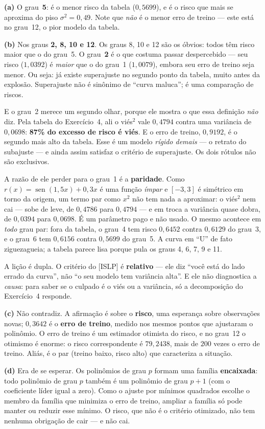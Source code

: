 \documentclass[11pt,a4paper]{article}
\begin{document}
\begin{solucao}
\textbf{(a)} O grau~\textbf{5}: é o menor risco da tabela ($0{,}5699$), e é o
risco que mais se aproxima do piso $\sigma^2=0{,}49$. Note que \emph{não} é o
menor erro de treino --- este está no grau~12, o pior modelo da tabela.

\smallskip
\textbf{(b)} Nos graus \textbf{2, 8, 10 e 12}. Os graus 8, 10 e 12 são os óbvios:
todos têm risco maior que o do grau~5. O grau~\textbf{2} é o que costuma passar
despercebido --- seu risco ($1{,}0392$) é \emph{maior} que o do grau~1
($1{,}0079$), embora seu erro de treino seja menor. Ou seja: já existe superajuste
no segundo ponto da tabela, muito antes da explosão. Superajuste não é sinônimo de
``curva maluca''; é uma comparação de riscos.

\smallskip
E o grau~2 merece um segundo olhar, porque ele mostra o que essa definição
\emph{não} diz. Pela tabela do Exercício~4, ali o viés$^2$ vale $0{,}4794$ contra
uma variância de $0{,}0698$: \textbf{87\% do excesso de risco é viés}. E o erro de
treino, $0{,}9192$, é o segundo mais alto da tabela. Esse é um modelo
\emph{rígido demais} --- o retrato do subajuste --- e ainda assim satisfaz o
critério de superajuste. Os dois rótulos não são exclusivos.

\smallskip
A razão de ele perder para o grau~1 é a \textbf{paridade}. Como
$r(x)=\operatorname{sen}(1{,}5x)+0{,}3x$ é uma função \emph{ímpar} e $[-3,3]$ é
simétrico em torno da origem, um termo par como $x^2$ não tem nada a aproximar:
o viés$^2$ nem cai --- sobe de leve, de $0{,}4786$ para $0{,}4794$ --- e em troca a
variância quase dobra, de $0{,}0394$ para $0{,}0698$. É um parâmetro pago e não
usado. O mesmo acontece em \emph{todo} grau par: fora da tabela, o grau~4 tem risco
$0{,}6452$ contra $0{,}6129$ do grau~3, e o grau~6 tem $0{,}6156$ contra $0{,}5699$
do grau~5. A curva em ``U'' de fato ziguezagueia; a tabela parece lisa porque pula
os graus 4, 6, 7, 9 e 11.

\smallskip
A lição é dupla. O critério do [ISLP] é \textbf{relativo} --- ele diz ``você está
do lado errado da curva'', não ``o seu modelo tem variância alta''. E ele não
diagnostica a \emph{causa}: para saber se o culpado é o viés ou a variância, só a
decomposição do Exercício~4 responde.

\smallskip
\textbf{(c)} Não contradiz. A afirmação é sobre o \textbf{risco}, uma esperança
sobre observações novas; $0{,}3642$ é o \textbf{erro de treino}, medido nos mesmos
pontos que ajustaram o polinômio. O erro de treino é um estimador otimista do
risco, e no grau~12 o otimismo é enorme: o risco correspondente é $79{,}2438$, mais
de $200$ vezes o erro de treino. Aliás, é o par (treino baixo, risco alto) que
caracteriza a situação.

\smallskip
\textbf{(d)} Era de se esperar. Os polinômios de grau $p$ formam uma família
\textbf{encaixada}: todo polinômio de grau $p$ também é um polinômio de grau $p+1$
(com o coeficiente líder igual a zero). Como o ajuste por mínimos quadrados escolhe
o membro da família que minimiza o erro de treino, ampliar a família só pode
manter ou reduzir esse mínimo. O risco, que não é o critério otimizado, não tem
nenhuma obrigação de cair --- e não cai.
\end{solucao}
\end{document}
